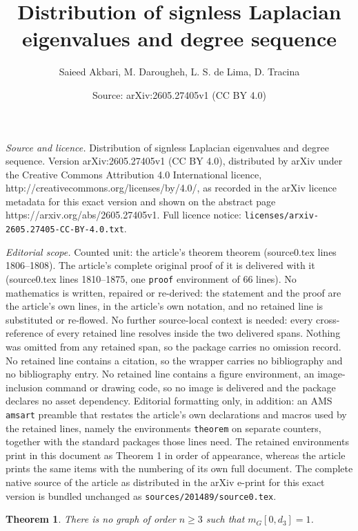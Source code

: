 \documentclass[10pt,a4paper]{amsart}
\title{Distribution of signless Laplacian eigenvalues and degree sequence}
\author{Saieed Akbari, M. Darougheh, L. S. de Lima, D. Tracina}
\date{Source: arXiv:2605.27405v1 (CC BY 4.0)}
\newtheorem{theorem}{Theorem}
\begin{document}
\maketitle

\noindent\emph{Source and licence.} Distribution of signless Laplacian eigenvalues and degree sequence. Version arXiv:2605.27405v1 (CC BY 4.0), distributed by arXiv under the Creative Commons Attribution 4.0 International licence, http://creativecommons.org/licenses/by/4.0/, as recorded in the arXiv licence metadata for this exact version and shown on the abstract page https://arxiv.org/abs/2605.27405v1. Full licence notice: \texttt{licenses/arxiv-2605.27405-CC-BY-4.0.txt}.\par\smallskip

\noindent\textit{Editorial scope.} Counted unit: the article's theorem theorem (source0.tex lines 1806--1808). The article's complete original proof of it is delivered with it (source0.tex lines 1810--1875, one \texttt{proof} environment of 66 lines). No mathematics is written, repaired or re-derived: the statement and the proof are the article's own lines, in the article's own notation, and no retained line is substituted or re-flowed.  No further source-local context is needed: every cross-reference of every retained line resolves inside the two delivered spans.  Nothing was omitted from any retained span, so the package carries no omission record.  No retained line contains a citation, so the wrapper carries no bibliography and no bibliography entry.  No retained line contains a figure environment, an image-inclusion command or drawing code, so no image is delivered and the package declares no asset dependency.  Editorial formatting only, in addition: an AMS \texttt{amsart} preamble that restates the article's own declarations and macros used by the retained lines, namely the environments \texttt{theorem} on separate counters, together with the standard packages those lines need.  The retained environments print in this document as Theorem 1 in order of appearance, whereas the article prints the same items with the numbering of its own full document.  The complete native source of the article as distributed in the arXiv e-print for this exact version is bundled unchanged as \texttt{sources/201489/source0.tex}.
\begin{theorem}
There is no graph of order $n \ge 3$ such that ${m_G}[0,{d_3}] = 1$.
\end{theorem}
\end{document}
